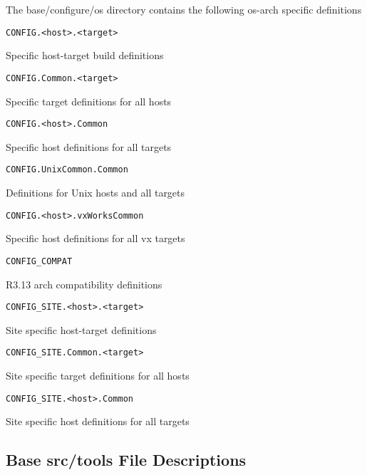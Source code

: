 The base/configure/os directory contains the following os-arch specific definitions

\begin{description}

\item {}\verb|CONFIG.<host>.<target>|

Specific host-target build definitions

\item {}\verb|CONFIG.Common.<target>|

Specific target definitions for all hosts

\item {}\verb|CONFIG.<host>.Common|

Specific host definitions for all targets

\item {}\verb|CONFIG.UnixCommon.Common|

Definitions for Unix hosts and all targets

\item {}\verb|CONFIG.<host>.vxWorksCommon|

Specific host definitions for all vx targets

\item {}\verb|CONFIG_COMPAT|

R3.13 arch compatibility definitions

\item {}\verb|CONFIG_SITE.<host>.<target>|

Site specific host-target definitions

\item {}\verb|CONFIG_SITE.Common.<target>|

Site specific target definitions for all hosts

\item {}\verb|CONFIG_SITE.<host>.Common|

Site specific host definitions for all targets

\end{description}

\subsection{Base src/tools File Descriptions}

